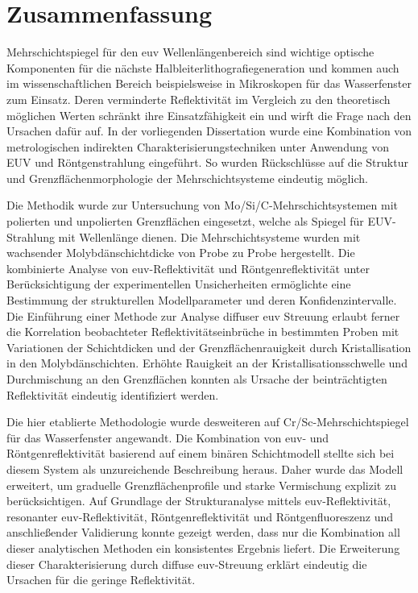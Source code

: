 \cleardoublepage

\thispagestyle{empty}

\section*{Zusammenfassung}

    Mehrschichtspiegel für den \gls{euv} Wellenlängenbereich sind wichtige optische Komponenten für die nächste Halbleiterlithografiegeneration und kommen auch im wissenschaftlichen Bereich beispielsweise in Mikroskopen für das Wasserfenster zum Einsatz. Deren verminderte Reflektivität im Vergleich zu den theoretisch möglichen Werten schränkt ihre Einsatzfähigkeit ein und wirft die Frage nach den Ursachen dafür auf. In der vorliegenden Dissertation wurde eine Kombination von metrologischen indirekten Charakterisierungstechniken unter Anwendung von EUV und Röntgenstrahlung eingeführt. So wurden Rückschlüsse auf die Struktur und Grenzflächenmorphologie der Mehrschichtsysteme eindeutig möglich.
    
    Die Methodik wurde zur Untersuchung von Mo/Si/C-Mehrschichtsystemen mit polierten und unpolierten Grenzflächen eingesetzt, welche als Spiegel für EUV-Strahlung mit  Wellenlänge dienen. Die Mehrschichtsysteme wurden mit wachsender Molybdänschichtdicke von Probe zu Probe hergestellt. Die kombinierte Analyse von \gls{euv}-Reflektivität und Röntgenreflektivität unter Berücksichtigung der experimentellen Unsicherheiten ermöglichte eine Bestimmung der strukturellen Modellparameter und deren Konfidenzintervalle. Die Einführung einer Methode zur Analyse diffuser \gls{euv} Streuung erlaubt ferner die Korrelation beobachteter Reflektivitätseinbrüche in bestimmten Proben mit Variationen der Schichtdicken und der Grenzflächenrauigkeit durch Kristallisation in den Molybdänschichten. Erhöhte Rauigkeit an der Kristallisationsschwelle und Durchmischung an den Grenzflächen konnten als Ursache der beinträchtigten Reflektivität eindeutig identifiziert werden.

    Die hier etablierte Methodologie wurde desweiteren auf Cr/Sc-Mehrschichtspiegel für das Wasserfenster angewandt. Die Kombination von \gls{euv}- und Röntgenreflektivität basierend auf einem binären Schichtmodell stellte sich bei diesem System als unzureichende Beschreibung heraus. Daher wurde das Modell erweitert, um graduelle Grenzflächenprofile und starke Vermischung explizit zu berücksichtigen. Auf Grundlage der Strukturanalyse mittels \gls{euv}-Reflektivität, resonanter \gls{euv}-Reflektivität, Röntgenreflektivität und Röntgenfluoreszenz und anschließender Validierung konnte gezeigt werden, dass nur die Kombination all dieser analytischen Methoden ein konsistentes Ergebnis liefert. Die Erweiterung dieser Charakterisierung durch diffuse \gls{euv}-Streuung erklärt eindeutig die Ursachen für die geringe Reflektivität.

\cleardoublepage
